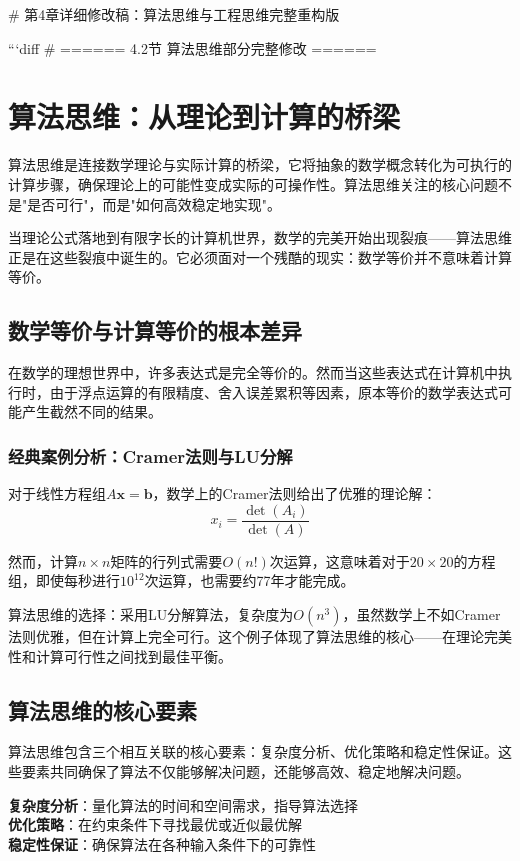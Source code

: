 # 第4章详细修改稿：算法思维与工程思维完整重构版

```diff
# ====== 4.2节 算法思维部分完整修改 ======

\section{算法思维：从理论到计算的桥梁}

算法思维是连接数学理论与实际计算的桥梁，它将抽象的数学概念转化为可执行的计算步骤，确保理论上的可能性变成实际的可操作性。算法思维关注的核心问题不是"是否可行"，而是"如何高效稳定地实现"。

当理论公式落地到有限字长的计算机世界，数学的完美开始出现裂痕——算法思维正是在这些裂痕中诞生的。它必须面对一个残酷的现实：数学等价并不意味着计算等价。

\subsection{数学等价与计算等价的根本差异}

在数学的理想世界中，许多表达式是完全等价的。然而当这些表达式在计算机中执行时，由于浮点运算的有限精度、舍入误差累积等因素，原本等价的数学表达式可能产生截然不同的结果。

\subsubsection{经典案例分析：Cramer法则与LU分解}

对于线性方程组$A\mathbf{x} = \mathbf{b}$，数学上的Cramer法则给出了优雅的理论解：
$$x_i = \frac{\det(A_i)}{\det(A)}$$

然而，计算$n \times n$矩阵的行列式需要$O(n!)$次运算，这意味着对于$20 \times 20$的方程组，即使每秒进行$10^{12}$次运算，也需要约77年才能完成。

算法思维的选择：采用LU分解算法，复杂度为$O(n^3)$，虽然数学上不如Cramer法则优雅，但在计算上完全可行。这个例子体现了算法思维的核心——在理论完美性和计算可行性之间找到最佳平衡。

\subsection{算法思维的核心要素}

算法思维包含三个相互关联的核心要素：复杂度分析、优化策略和稳定性保证。这些要素共同确保了算法不仅能够解决问题，还能够高效、稳定地解决问题。

\begin{tcolorbox}[colback=orange!5!white,colframe=orange!75!black,title=核心要素：算法思维的三大支柱]
\textbf{复杂度分析}：量化算法的时间和空间需求，指导算法选择\\
\textbf{优化策略}：在约束条件下寻找最优或近似最优解\\
\textbf{稳定性保证}：确保算法在各种输入条件下的可靠性
\end{tcolorbox}

